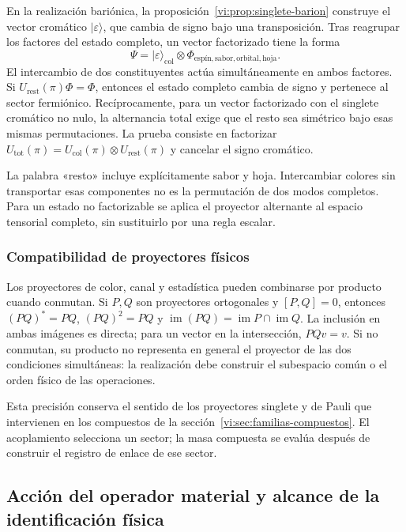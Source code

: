 En la realización bariónica, la
proposición~\ref{vi:prop:singlete-barion} construye el vector
cromático \(|\varepsilon\rangle\), que cambia de signo
bajo una transposición. Tras reagrupar los factores del estado
completo, un vector factorizado tiene la forma
\[
 \Psi=|\varepsilon\rangle_{\mathrm{col}}
 \otimes\Phi_{\mathrm{espín,sabor,orbital,hoja}}.
\]
El intercambio de dos constituyentes actúa simultáneamente
en ambos factores. Si \(U_{\mathrm{rest}}(\pi)\Phi=\Phi\),
entonces el estado completo cambia de signo y pertenece al
sector fermiónico. Recíprocamente, para un vector factorizado
con el singlete cromático no nulo, la alternancia total exige
que el resto sea simétrico bajo esas mismas permutaciones.
La prueba consiste en factorizar
\(U_{\mathrm{tot}}(\pi)=U_{\mathrm{col}}(\pi)\otimes
U_{\mathrm{rest}}(\pi)\) y cancelar el signo cromático.

La palabra «resto» incluye explícitamente sabor y hoja.
Intercambiar colores sin transportar esas componentes no es
la permutación de dos modos completos. Para un estado no
factorizable se aplica el proyector alternante al espacio
tensorial completo, sin sustituirlo por una regla escalar.

\subsubsection{Compatibilidad de proyectores físicos}

Los proyectores de color, canal y estadística pueden combinarse
por producto cuando conmutan. Si \(P,Q\) son proyectores
ortogonales y \([P,Q]=0\), entonces
\((PQ)^*=PQ\), \((PQ)^2=PQ\) y
\(\operatorname{im}(PQ)=\operatorname{im}P\cap\operatorname{im}Q\).
La inclusión en ambas imágenes es directa; para un vector
en la intersección, \(PQv=v\). Si no conmutan, su producto
no representa en general el proyector de las dos condiciones
simultáneas: la realización debe construir el subespacio
común o el orden físico de las operaciones.

Esta precisión conserva el sentido de los proyectores
singlete y de Pauli que intervienen en los compuestos de la
sección~\ref{vi:sec:familias-compuestos}. El acoplamiento
selecciona un sector; la masa compuesta se evalúa después
de construir el registro de enlace de ese sector.

\subsection{Acción del operador material y alcance de la identificación física}
\label{vi:subsec:fock-alcance}


